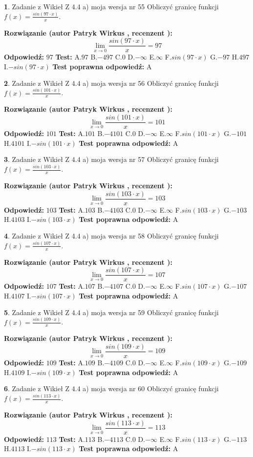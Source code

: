 \documentclass[12pt, a4paper]{article}
\theoremstyle{definition} %
\newtheorem{zad}{}
\newcommand{\zadStart}[1]{\begin{zad}#1\newline}
\newcommand{\zadStop}{\end{zad}}
\newcommand{\rozwStart}[2]{\noindent \textbf{Rozwiązanie (autor #1 , recenzent #2): }\newline}
\newcommand{\rozwStop}{\newline}
\newcommand{\odpStart}{\noindent \textbf{Odpowiedź:}\newline}
\newcommand{\odpStop}{\newline}
\newcommand{\testStart}{\noindent \textbf{Test:}\newline}
\newcommand{\testStop}{\newline}
\newcommand{\kluczStart}{\noindent \textbf{Test poprawna odpowiedź:}\newline}
\newcommand{\kluczStop}{\newline}
\begin{document}
\zadStart{Zadanie z Wikieł Z 4.4 a) moja wersja nr 55}
Obliczyć granicę funkcji $f(x)=\frac{sin(97\cdot x)}{x}$.
\zadStop
\rozwStart{Patryk Wirkus}{}
$$\lim\limits_{x\to 0}\frac{sin(97\cdot x)}{x}=
97$$
\rozwStop
\odpStart
$97$
\odpStop
\testStart
A.$97$
B.$-497$
C.$0$
D.$-\infty$
E.$\infty$
F.$sin(97\cdot x)$
G.$-97$
H.$497$
I.$-sin(97\cdot x)$
\testStop
\kluczStart
A
\kluczStop



\zadStart{Zadanie z Wikieł Z 4.4 a) moja wersja nr 56}
Obliczyć granicę funkcji $f(x)=\frac{sin(101\cdot x)}{x}$.
\zadStop
\rozwStart{Patryk Wirkus}{}
$$\lim\limits_{x\to 0}\frac{sin(101\cdot x)}{x}=
101$$
\rozwStop
\odpStart
$101$
\odpStop
\testStart
A.$101$
B.$-4101$
C.$0$
D.$-\infty$
E.$\infty$
F.$sin(101\cdot x)$
G.$-101$
H.$4101$
I.$-sin(101\cdot x)$
\testStop
\kluczStart
A
\kluczStop



\zadStart{Zadanie z Wikieł Z 4.4 a) moja wersja nr 57}
Obliczyć granicę funkcji $f(x)=\frac{sin(103\cdot x)}{x}$.
\zadStop
\rozwStart{Patryk Wirkus}{}
$$\lim\limits_{x\to 0}\frac{sin(103\cdot x)}{x}=
103$$
\rozwStop
\odpStart
$103$
\odpStop
\testStart
A.$103$
B.$-4103$
C.$0$
D.$-\infty$
E.$\infty$
F.$sin(103\cdot x)$
G.$-103$
H.$4103$
I.$-sin(103\cdot x)$
\testStop
\kluczStart
A
\kluczStop



\zadStart{Zadanie z Wikieł Z 4.4 a) moja wersja nr 58}
Obliczyć granicę funkcji $f(x)=\frac{sin(107\cdot x)}{x}$.
\zadStop
\rozwStart{Patryk Wirkus}{}
$$\lim\limits_{x\to 0}\frac{sin(107\cdot x)}{x}=
107$$
\rozwStop
\odpStart
$107$
\odpStop
\testStart
A.$107$
B.$-4107$
C.$0$
D.$-\infty$
E.$\infty$
F.$sin(107\cdot x)$
G.$-107$
H.$4107$
I.$-sin(107\cdot x)$
\testStop
\kluczStart
A
\kluczStop



\zadStart{Zadanie z Wikieł Z 4.4 a) moja wersja nr 59}
Obliczyć granicę funkcji $f(x)=\frac{sin(109\cdot x)}{x}$.
\zadStop
\rozwStart{Patryk Wirkus}{}
$$\lim\limits_{x\to 0}\frac{sin(109\cdot x)}{x}=
109$$
\rozwStop
\odpStart
$109$
\odpStop
\testStart
A.$109$
B.$-4109$
C.$0$
D.$-\infty$
E.$\infty$
F.$sin(109\cdot x)$
G.$-109$
H.$4109$
I.$-sin(109\cdot x)$
\testStop
\kluczStart
A
\kluczStop



\zadStart{Zadanie z Wikieł Z 4.4 a) moja wersja nr 60}
Obliczyć granicę funkcji $f(x)=\frac{sin(113\cdot x)}{x}$.
\zadStop
\rozwStart{Patryk Wirkus}{}
$$\lim\limits_{x\to 0}\frac{sin(113\cdot x)}{x}=
113$$
\rozwStop
\odpStart
$113$
\odpStop
\testStart
A.$113$
B.$-4113$
C.$0$
D.$-\infty$
E.$\infty$
F.$sin(113\cdot x)$
G.$-113$
H.$4113$
I.$-sin(113\cdot x)$
\testStop
\kluczStart
A
\kluczStop
\end{document}
